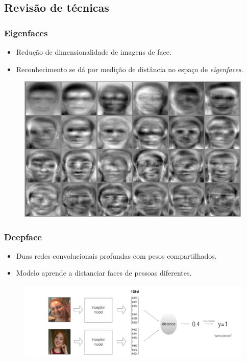 \documentclass{beamer}
\begin{document}
\subsection{Revisão de técnicas}
\begin{frame}
\frametitle{Eigenfaces ~\cite{eigenfaces}}
\begin{itemize}
    \item Redução de dimensionalidade de imagens de face.
    \item Reconhecimento se dá por medição de distância no espaço de \textit{eigenfaces}.
\end{itemize}
    \begin{figure}
    \includegraphics[width=0.75\linewidth]{figs/eigenfaces.png}
    \end{figure}
\end{frame}
\begin{frame}
\frametitle{Deepface~\cite{deepface}}
\begin{itemize}
    \item Duas redes convolucionais profundas com pesos compartilhados.
    \item Modelo aprende a distanciar faces de pessoas diferentes.
\end{itemize}
    \begin{figure}
    \includegraphics[width=\linewidth]{figs/siamese.png}
    \end{figure}
\end{frame}
\end{document}
